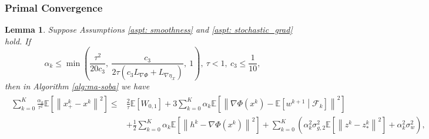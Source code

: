 \documentclass[10pt]{article}
\newtheorem{lemma}{Lemma}[section]
\theoremstyle{remark}
\newcommand{\cX}{\mathcal{X}}
\def\setF{\mathscr{F}} %
\newcommand{\E}{\mathbb{E}}
\newcommand{\norm}[1]{\left\|#1\right\|}
\begin{document}
\subsubsection{Primal Convergence}
\begin{lemma}\label{lem: primal_simple}
    Suppose Assumptions \ref{aspt: smoothness} and \ref{aspt: stochastic_grad} hold. If
    \begin{equation}\label{ineq: conditions_primal_simple}
        \alpha_k\leq \min\left(\frac{\tau^2}{20c_3},\ \frac{c_3}{2\tau\left(c_3L_{\nabla\Phi} + L_{\nabla\eta_{\cX}}\right)},\ 1\right),\ \tau < 1,\ c_3 \leq \frac{1}{10},
    \end{equation}
    then in Algorithm \ref{alg:ma-soba} we have
    \begin{align}\label{ineq: primal_decrease_simple}
        \begin{aligned}
            \sum_{k=0}^{K}\frac{\alpha_k}{\tau^2}\E\left[\norm{x_+^k-x^k}^2\right]\leq &\frac{2}{\tau}\E\left[W_{0,1}\right] + 3\sum_{k=0}^{K}\alpha_k\E\left[\norm{\nabla\Phi(x^k) - \E\left[w^{k+1}\middle|\setF_k\right]}^2\right] \\
            &+ \frac{1}{2}\sum_{k=0}^{K}\alpha_k\E\left[\norm{h^k - \nabla\Phi(x^k)}^2\right] + \sum_{k=0}^{K}\left(\alpha_k^2\sigma_{g,2}^2\E\left[\norm{z^k - z_*^k}^2\right] + \alpha_k^2\sigma_w^2\right),
        \end{aligned}
    \end{align}
\end{lemma}
\end{document}
